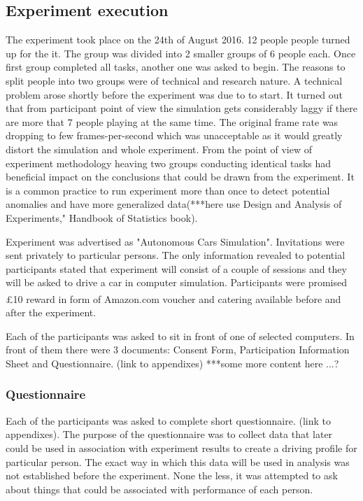 \documentclass[11pt,english]{article}
\begin{document}
\subsection{Experiment execution}

The experiment took place on the 24th of August 2016. 12 people people turned up for the it. The group was divided into 2 smaller groups of 6 people each. Once first group completed all tasks, another one was asked to begin. The reasons to split people into two groups were of technical and research nature. A technical problem arose shortly before the experiment was due to to start. It turned out that from participant point of view the simulation gets considerably laggy if there are more that 7 people playing at the same time. The original frame rate was dropping to few frames-per-second which was unacceptable as it would greatly distort the simulation and whole experiment. From the point of view of experiment methodology heaving two groups conducting identical tasks had beneficial impact on the conclusions that could be drawn from the experiment. It is a common practice to run experiment more than once to detect potential anomalies and have more generalized data(***here use Design and Analysis of Experiments," Handbook of Statistics book).





Experiment was advertised as "Autonomous Cars Simulation". Invitations were sent privately to particular persons. The only information revealed to potential participants stated that experiment will consist of a couple of sessions and they will be asked to drive a car in computer simulation. Participants were promised £10 reward in form of Amazon.com\textsuperscript{\textregistered} voucher and catering available before and after the experiment.


Each of the participants was asked to sit in front of one of selected computers. In front of them there were 3 documents: Consent Form, Participation Information Sheet and Questionnaire. (link to appendixes)
***some more content here
...?

\subsubsection{Questionnaire}

Each of the participants was asked to complete short questionnaire. (link to appendixes). The purpose of the questionnaire was to collect data that later could be used in association with experiment results to create a driving profile for particular person. The exact way in which this data will be used in analysis was not established before the experiment. None the less, it was attempted to ask about things that could be associated with performance of each person.
\end{document}
